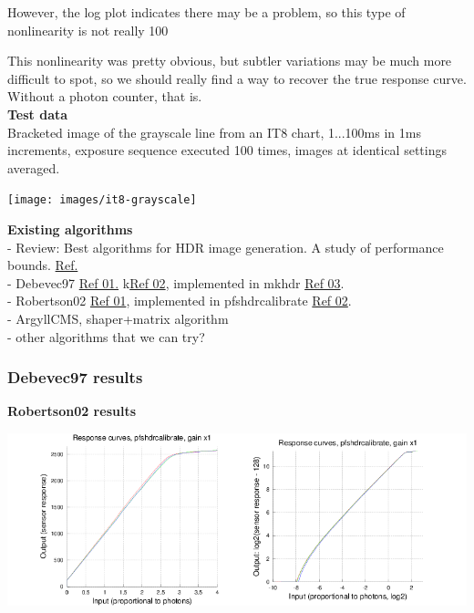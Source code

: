{However, the log plot indicates there may be a problem, so this type of nonlinearity is not really 100%

This nonlinearity was pretty obvious, but subtler variations may be much more difficult to spot, so we should really find a way to recover the true response curve. Without a photon counter, that is. \\

\textbf{Test data}\\

Bracketed image of the grayscale line from an IT8 chart, 1...100ms in 1ms increments, exposure sequence executed 100 times, images at identical settings averaged. 

\begin{center}
\texttt{[image: images/it8-grayscale]}
\end{center}

\textbf{Existing algorithms}\\

- Review: Best algorithms for HDR image generation. A study of performance bounds. \href{https://hal.archives-ouvertes.fr/file/index/docid/733853/filename/best_hdr_algo_hal.pdf}{Ref.}\\
- Debevec97 \href{http://www.pauldebevec.com/Research/HDR/debevec-siggraph97.pdf}{Ref 01.} k\href{http://pages.cs.wisc.edu/~csverma/CS766_09/HDRI/hdr.html}{Ref 02}, implemented in mkhdr \href{http://duikerresearch.com/mkhdr-archive/}{Ref 03}.\\
- Robertson02 \href{http://pages.cs.wisc.edu/~lizhang/courses/cs766-2008f/projects/hdr/Robertson2003ETA.pdf}{Ref 01}, implemented in pfshdrcalibrate \href{http://resources.mpi-inf.mpg.de/hdr/calibration/pfs.html}{Ref 02}.\\
- ArgyllCMS, shaper+matrix algorithm\\
- other algorithms that we can try? \\


\subsubsection{Debevec97 results}

\textbf{Robertson02 results}

\begin{center}
\includegraphics[height=5cm]{images/response-curve-pfs}
\end{center}

}
